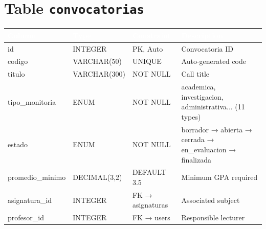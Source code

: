 \documentclass[12pt,a4paper,twoside]{report}
\begin{document}
\section{Table \texttt{convocatorias}}
\begin{center}
\begin{tabularx}{\textwidth}{|l|l|l|X|}
\hline
\rowcolor{tableHdr}
\textcolor{white}{\textbf{Column}} & \textcolor{white}{\textbf{Type}} &
\textcolor{white}{\textbf{Constraint}} & \textcolor{white}{\textbf{Description}} \\
\hline
\rowcolor{rowOdd}id & INTEGER & PK, Auto & Convocatoria ID \\
\hline\rowcolor{rowEven}codigo & VARCHAR(50) & UNIQUE & Auto-generated code \\
\hline\rowcolor{rowOdd}titulo & VARCHAR(300) & NOT NULL & Call title \\
\hline\rowcolor{rowEven}tipo\_monitoria & ENUM & NOT NULL & academica, investigacion, administrativa... (11 types) \\
\hline\rowcolor{rowOdd}estado & ENUM & NOT NULL & borrador → abierta → cerrada → en\_evaluacion → finalizada \\
\hline\rowcolor{rowEven}promedio\_minimo & DECIMAL(3,2) & DEFAULT 3.5 & Minimum GPA required \\
\hline\rowcolor{rowOdd}asignatura\_id & INTEGER & FK → asignaturas & Associated subject \\
\hline\rowcolor{rowEven}profesor\_id & INTEGER & FK → users & Responsible lecturer \\
\hline
\end{tabularx}
\end{center}
\end{document}
